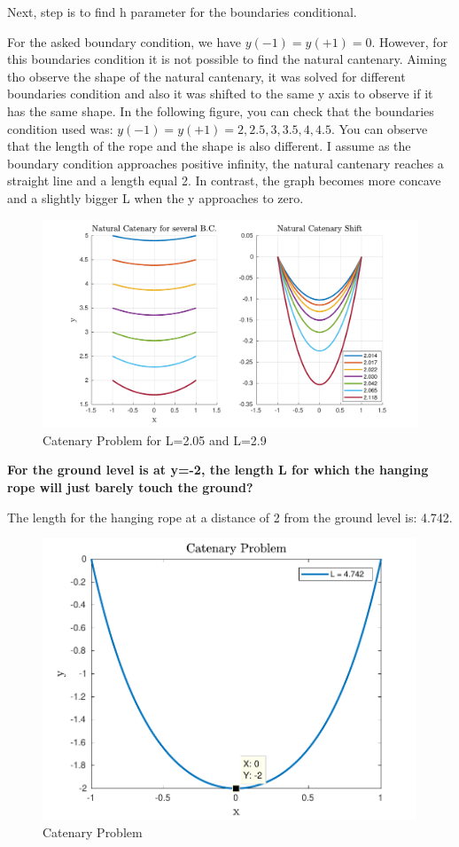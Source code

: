 \documentclass{article}
\begin{document}
Next, step is to find h parameter for the boundaries conditional. 

For the asked boundary condition, we have $y(-1)=y(+1)=0$. However, for this boundaries condition it is not possible to find the natural cantenary. Aiming tho observe the shape of the natural cantenary, it was solved for different boundaries condition and also it was shifted to the same y axis to observe if it has the same shape. In the following figure, you can check that the boundaries condition used was: $y(-1)=y(+1)=2,2.5,3,3.5,4,4.5$. You can observe that the length of the rope and the shape is also different. I assume as the boundary condition approaches positive infinity, the natural cantenary reaches a straight line and a length equal 2. In contrast, the graph becomes more concave and a slightly bigger L when the y approaches to zero.

\begin{figure}[H]
\centering
\includegraphics [width=4.in]{f4}
\caption{Catenary Problem for L=2.05 and L=2.9}
\end{figure}


\textbf{For the ground level is at y=-2, the length L for which the hanging rope will just barely touch the ground?}

The length for the hanging rope at a distance of 2 from the ground level is: 4.742.

\begin{figure}[H]
\centering
\includegraphics [width=4.4in]{f2}
\caption{Catenary Problem}
\end{figure}
\end{document}
